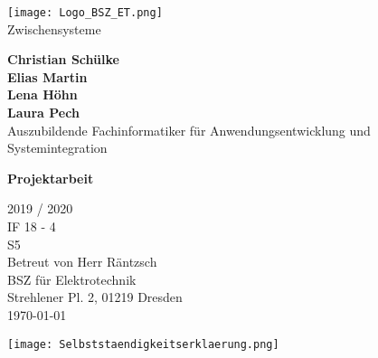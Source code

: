 \begin{titlepage}
    \begin{center}
        \texttt{[image: Logo\_BSZ\_ET.png]}\\
        \vspace*{1cm}
        {\huge{Zwischensysteme}}
 
        \vspace{0.5cm}
         
        \vspace{1.5cm}
 
        \textbf{Christian Schülke\\Elias Martin\\Lena Höhn\\Laura Pech}\\
        Auszubildende Fachinformatiker für Anwendungsentwicklung und Systemintegration\\

        \vfill
 



        \vfill
        {\huge\textbf{Projektarbeit}}
        
    
        \vspace{1cm}
        {\Huge 2019 / 2020}\\
        \vspace{0.8cm}
        IF 18 - 4\\
        S5\\
        Betreut von Herr Räntzsch\\
        BSZ für Elektrotechnik\\
        Strehlener Pl. 2, 01219 Dresden\\
        \today
             
    \end{center}
 \end{titlepage}
 \pagebreak
 \texttt{[image: Selbststaendigkeitserklaerung.png]}